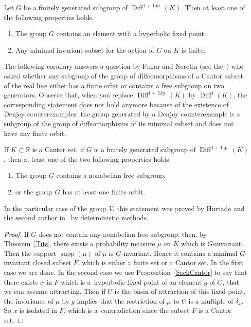\documentclass[AHL,Unicode,longabstracts,published]{cedram}
\DeclareMathOperator{\Diff}{Diff}
\DeclareMathOperator{\Lip}{Lip}
\DeclareMathOperator{\supp}{supp}
\newcommand{\R}{\mathbb{R}}
\newcounter{setofcase}
\newcounter{case}[setofcase]
\newcommand{\R}{\mathbb{R}}
\begin{document}
\begin{prop}\label{SackCantor}
Let $G$ be a finitely generated subgroup of $\Diff^{1+\Lip}(K)$. Then at least one of the following properties holds.
\begin{enumerate}
\item\label{prop1.6.1} The group $G$ contains an element with a hyperbolic fixed point.
\item\label{prop1.6.2} Any minimal invariant subset for the action of $G$ on $K$ is finite.
\end{enumerate}
\end{prop}


The following corollary answers a question by Funar and Neretin (see the~\cite[last section]{FN}) who asked whether any subgroup of the group of diffeomorphisms of a Cantor subset of the real line either has a finite orbit or contains a free subgroup on two generators. Observe that, when you replace $\Diff^{1+\Lip}(K)$ by $\Diff^1(K)$, the corresponding statement does not hold anymore because of the existence of Denjoy counterexamples: the group generated by a Denjoy counterexample is a subgroup of the group of diffeomorphisms of its minimal subset and does not have any finite orbit.

\begin{coro}
If $K\subset \R$ is a Cantor set, if $G$ is a finitely generated subgroup of $\Diff^{1+\Lip}(K)$, then at least one of the two following properties holds.
\begin{enumerate}
\item The group $G$ contains a nonabelian free subgroup,
\item or the group $G$ has at least one finite orbit.
\end{enumerate}
\end{coro}

In the particular case of the group $V$, this statement was proved by Hurtado and the second author in~\cite{HM} by deterministic methods.


\begin{proof}
If $G$ does not contain any nonabelian free subgroup, then, by Theorem~\ref{Tits}, there exists a probability measure $\mu$ on $K$ which is $G$-invariant. Then the support $\supp(\mu)$ of $\mu$ is $G$-invariant. Hence it contains a minimal $G$-invariant closed subset $F$, which is either a finite set or a Cantor set. In the first case we are done. In the second case we use Proposition~\ref{SackCantor} to say that there exists $x$ in $F$ which is a~hyperbolic fixed point of an element $g$ of $G$, that we can assume attracting. Then if $U$ is the basin of attraction of this fixed point, the invariance of $\mu$ by $g$ implies that the restriction of $\mu$ to $U$ is a multiple of $\delta_x$. So $x$ is isolated in $F$, which is a~contradiction since the subset $F$ is a Cantor set.
\end{proof}
\end{document}
